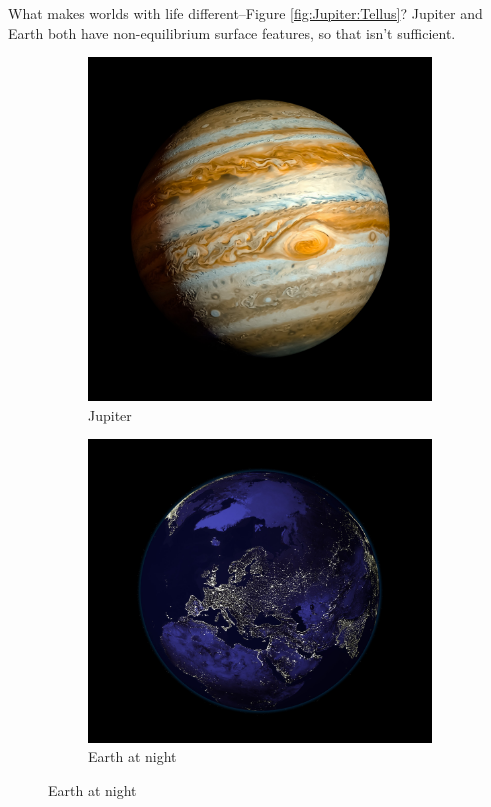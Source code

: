 \documentclass[]{article}
\begin{document}
 What makes worlds with life different--Figure \ref{fig:Jupiter:Tellus}? Jupiter and Earth both have non-equilibrium surface features, so that isn't sufficient.

\begin{figure}[H]
	\caption{What makes worlds with life different?}\label{fig:Jupiter:Tellus}
	\begin{subfigure}[b]{0.45\textwidth}
		\caption{Jupiter}\label{fig:Jupiter}
		\includegraphics[width=\textwidth]{Jupiter}
	\end{subfigure}
	\begin{subfigure}[b]{0.45\textwidth}
		\caption{Earth at night}\label{fig:Earth}
		\includegraphics[width=\textwidth]{Tellus}
	\end{subfigure}
\end{figure}
\end{document}
